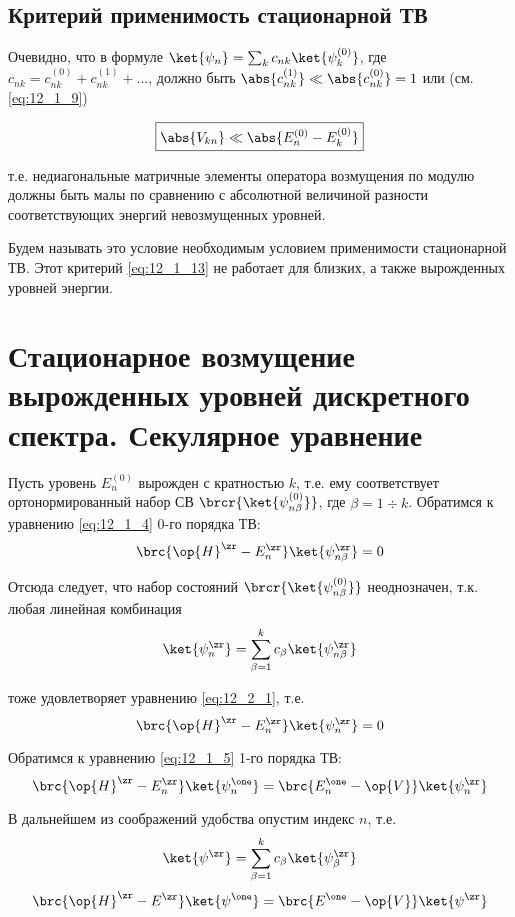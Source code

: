 \subsection{Критерий применимость стационарной ТВ}
 
Очевидно, что в формуле $\ket{\psi_n} = \sum_k c_{nk} \ket{\psi_k^{(0)}}$, где $c_{nk} = c_{nk}^{(0)} + c_{nk}^{(1)} + ...$, должно быть $\abs{c_{nk}^{(1)}} \ll \abs{c_{nk}^{(0)}} = 1$ или (см. \eqref{eq:12_1_9})

\begin{equation}
\label{eq:12_1_13}
\boxed{\abs{V_{kn}} \ll \abs{E_n^{(0)} - E_k^{(0)}}}
\end{equation}

т.е. недиагональные матричные элементы оператора возмущения по модулю должны быть малы по сравнению с абсолютной величиной разности соответствующих энергий невозмущенных уровней.

Будем называть это условие необходимым условием применимости стационарной ТВ. Этот критерий \eqref{eq:12_1_13} не работает для близких, а также вырожденных уровней энергии.

\section{Стационарное возмущение вырожденных уровней дискретного спектра. Секулярное уравнение}

Пусть уровень $E_n^{(0)}$ вырожден с кратностью $k$, т.е. ему соответствует ортонормированный набор СВ $\brcr{\ket{\psi_{n \beta}^{(0)}}}$, где $\beta = 1 \div k$. Обратимся к уравнению \eqref{eq:12_1_4} 0-го порядка ТВ:
\begin{equation}
\label{eq:12_2_1}
\brc{\op{H}^\zr - E_n^\zr} \ket{\psi_{n \beta}^\zr} = 0
\end{equation}

Отсюда следует, что набор состояний $\brcr{\ket{\psi_{n \beta}^{(0)}}}$ неоднозначен, т.к. любая линейная комбинация
$$
\ket{\psi_n^\zr} = \sum_{\beta = 1}^k c_\beta \ket{\psi_{n \beta}^\zr}
$$

тоже удовлетворяет уравнению \eqref{eq:12_2_1}, т.е.
$$
\brc{\op{H}^\zr - E_n^\zr} \ket{\psi_{n}^\zr} = 0
$$

Обратимся к уравнению \eqref{eq:12_1_5} 1-го порядка ТВ:
$$
\brc{\op{H}^\zr - E_n^\zr} \ket{\psi_{n} ^\one} = \brc{E_n^\one - \op{V}} \ket{\psi_n^\zr}
$$

В дальнейшем из соображений удобства опустим индекс $n$, т.е.
$$
\ket{\psi^\zr} = \sum_{\beta = 1}^k c_\beta \ket{\psi_{\beta}^\zr}
$$
\begin{equation}
\label{eq:12_2_2}
\brc{\op{H}^\zr - E^\zr} \ket{\psi ^\one} = \brc{E^\one - \op{V}} \ket{\psi^\zr}
\end{equation}

